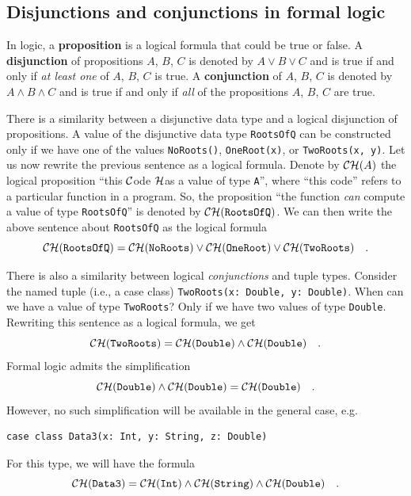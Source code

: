 \subsection{Disjunctions and conjunctions in formal logic\label{subsec:Disjunctions-and-conjunctions}}

In logic, a \textbf{proposition} is
a logical formula that could be true or false. A \textbf{disjunction}
of propositions $A$, $B$, $C$ is denoted by $A\vee B\vee C$ and
is true if and only if \emph{at least one} of $A$, $B$, $C$ is
true. A \textbf{conjunction} of $A$,
$B$, $C$ is denoted by $A\wedge B\wedge C$ and is true if and only
if \emph{all} of the propositions $A$, $B$, $C$ are true.

There is a similarity between a disjunctive data type and a logical
disjunction of propositions. A value of the disjunctive data type
\lstinline!RootsOfQ! can be constructed only if we have one of the
values \lstinline!NoRoots()!, \lstinline!OneRoot(x)!, or \lstinline!TwoRoots(x, y)!.
Let us now rewrite the previous sentence as a logical formula. Denote
by ${\cal CH}(A)$ the logical proposition \textsf{``}this ${\cal C}$ode
${\cal H}$as a value of type \lstinline!A!\textsf{''}, where \textsf{``}this code\textsf{''}
refers to a particular function in a program. So, the proposition
\textsf{``}the function \emph{can} compute a value of type \lstinline!RootsOfQ!\textsf{''}
is denoted by ${\cal CH}(\text{\texttt{RootsOfQ}})$. We can then
write the above sentence about \lstinline!RootsOfQ! as the logical
formula
\begin{equation}
{\cal CH}(\text{\texttt{RootsOfQ}})={\cal CH}(\text{\texttt{NoRoots}})\vee{\cal CH}(\text{\texttt{OneRoot}})\vee{\cal CH}(\text{\texttt{TwoRoots}})\quad.\label{eq:curry-howard-example-disjunction}
\end{equation}

There is also a similarity between logical \emph{conjunctions} and
tuple types. Consider the named tuple (i.e., a case class) \lstinline!TwoRoots(x: Double, y: Double)!.
When can we have a value of type \lstinline!TwoRoots!? Only if we
have two values of type \lstinline!Double!. Rewriting this sentence
as a logical formula, we get
\[
{\cal CH}(\text{\texttt{TwoRoots}})={\cal CH}(\text{\texttt{Double}})\wedge{\cal CH}(\text{\texttt{Double}})\quad.
\]
Formal logic admits the simplification
\[
{\cal CH}(\text{\texttt{Double}})\wedge{\cal CH}(\text{\texttt{Double}})={\cal CH}(\text{\texttt{Double}})\quad.
\]
However, no such simplification will be available in the general case,
e.g.
\begin{lstlisting}
case class Data3(x: Int, y: String, z: Double)
\end{lstlisting}
For this type, we will have the formula 
\begin{equation}
{\cal CH}(\text{\texttt{Data3}})={\cal CH}(\text{\texttt{Int}})\wedge{\cal CH}(\text{\texttt{String}})\wedge{\cal CH}(\text{\texttt{Double}})\quad.\label{eq:curry-howard-example-case-class}
\end{equation}

